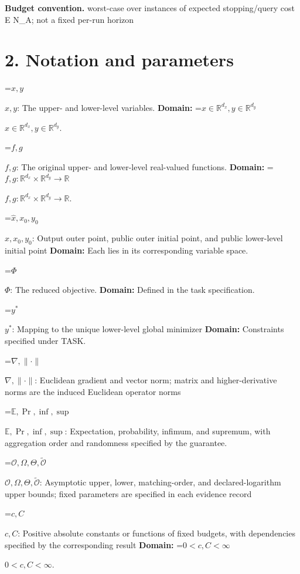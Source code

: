 \documentclass[10pt,a4paper]{article}
\newcommand{\AtlasMath}[1]{\par\begingroup\centering\setbox0=\hbox{$\displaystyle #1$}\ifdim\wd0>1.4\linewidth\typeout{ATLAS WIDE FORMULA: \the\wd0}\fi\ifdim\wd0>\linewidth\resizebox{\linewidth}{!}{\box0}\else\box0\fi\par\endgroup}
\newcommand{\AtlasInlineMath}[1]{\begingroup\setbox0=\hbox{$#1$}\ifdim\wd0>.4\linewidth\endgroup\AtlasMath{#1}\else\endgroup$#1$\fi}
\begin{document}
\textbf{Budget convention.} worst-case over instances of expected stopping/query cost E N\_A; not a fixed per-run horizon



\section{2. Notation and parameters}


\AtlasInlineMath{x,y}: The upper- and lower-level variables. \textbf{Domain:} \AtlasInlineMath{x\in\mathbb R^{d_x},y\in\mathbb R^{d_y}}.



\AtlasInlineMath{f,g}: The original upper- and lower-level real-valued functions. \textbf{Domain:} \AtlasInlineMath{f,g:\mathbb R^{d_x}\times\mathbb R^{d_y}\to\mathbb R}.



\AtlasInlineMath{\widehat x,x_0,y_0}: Output outer point, public outer initial point, and public lower-level initial point \textbf{Domain:} Each lies in its corresponding variable space.



\AtlasInlineMath{\Phi}: The reduced objective. \textbf{Domain:} Defined in the task specification.



\AtlasInlineMath{y^*}: Mapping to the unique lower-level global minimizer \textbf{Domain:} Constraints specified under TASK.



\AtlasInlineMath{\nabla,\|\cdot\|}: Euclidean gradient and vector norm; matrix and higher-derivative norms are the induced Euclidean operator norms



\AtlasInlineMath{\mathbb E,\Pr,\inf,\sup}: Expectation, probability, infimum, and supremum, with aggregation order and randomness specified by the guarantee.



\AtlasInlineMath{\mathcal O,\Omega,\Theta,\widetilde{\mathcal O}}: Asymptotic upper, lower, matching-order, and declared-logarithm upper bounds; fixed parameters are specified in each evidence record



\AtlasInlineMath{c,C}: Positive absolute constants or functions of fixed budgets, with dependencies specified by the corresponding result \textbf{Domain:} \AtlasInlineMath{0<c,C<\infty}.
\end{document}
